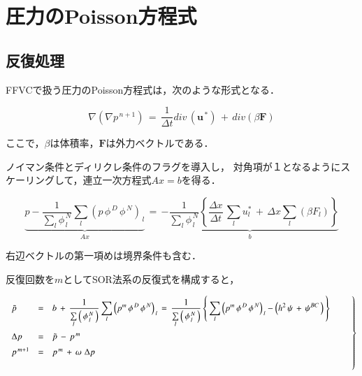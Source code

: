 \graphicspath{{./fig_EBCS/}}
%
\section{圧力のPoisson方程式}

\subsection{反復処理}

FFVCで扱う圧力のPoisson方程式は，次のような形式となる．

\begin{equation}
\nabla \left( \nabla p^{\,n+1} \right) \,=\, \frac{1}{\Delta t} div\, ( \bm{u}^{\,*}) \,+\, div( \beta \bm{F} )
\label{eq:Poisson_ffvc}
\end{equation}


\noindent ここで，$\beta$は体積率，$\bm{F}$は外力ベクトルである．

ノイマン条件とディリクレ条件のフラグを導入し，
対角項が１となるようにスケーリングして，連立一次方程式$Ax = b$を得る．

\begin{equation}
\underbrace{ p  -  \frac{1}{\sum \limits_l \phi^{\,N}_{\,l}} \sum \limits_l {\left( p \,\phi^{\,D} \,\phi^{\,N} \right)}_{\,l} } \limits_{A x }
\,=\,
 \displaystyle { 
\underbrace{ -
\frac{1}{\sum \limits_l \phi^{\,N}_{\,l}} 
\left\{ 
\frac{\Delta x}{\Delta t} \,\sum \limits_l u^*_l \,+\, \Delta x \sum \limits_l (\beta F_l)
\right\}
} \limits_{ b }
}
\label{eq:ebcs_poisson-discrete}
\end{equation}

\noindent 右辺ベクトルの第一項めは境界条件も含む．


反復回数を$m$としてSOR法系の反復式を構成すると，

\begin{equation}
\left.
\begin{array}{lll}
\vspace{2mm}
\tilde{p} & = & \displaystyle {  b \, + \,
 \frac{1}{\sum \limits_l \left( \, \phi^{\,N}_{\,l} \, \right)} \sum \limits_l {\left( p^m \,\phi^{\,D} \,\phi^{\,N}\right)}_{\,l} 
 \,=\,
\frac{1}{\sum \limits_l \left( \, \phi^{\,N}_{\,l} \, \right)} 
\left \{ \,
\sum \limits_l {\left( p^m \,\phi^{\,D} \,\phi^{\,N}\right)}_{\,l} 
- \left( h^2 \,\psi \,+\,  \psi^{BC} \, \right)
\, \right \} } \\
\vspace{2mm}
\Delta p & = & \tilde{p} \,-\, p^{\,m} \\
\vspace{5mm}
p^{\,m+1} & = & p^{\,m} \,+\, \omega\, \,\Delta p \\

\end{array} \qquad \right \}
\label{eq:poisson_iteration}
\end{equation}



